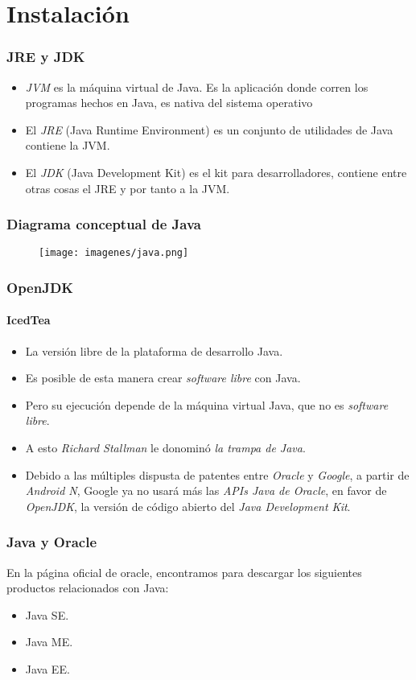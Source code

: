 \documentclass{beamer}
\begin{document}
\section{Instalación}

\begin{frame}[fragile]
\frametitle{JRE y JDK}
\begin{itemize}[<+->]
\item \emph{JVM} es la máquina virtual de Java. Es la aplicación donde corren los programas hechos en Java, es nativa del sistema operativo 
\item El \emph{JRE} (Java Runtime Environment) es un conjunto de utilidades de Java contiene la JVM. 
\item El \emph{JDK} (Java Development Kit) es el kit para desarrolladores, contiene entre otras cosas el JRE y por tanto a la JVM.
\end{itemize}
\end{frame}

\begin{frame}
\frametitle{Diagrama conceptual de Java}
\begin{figure}
\texttt{[image: imagenes/java.png]}
\end{figure}
\end{frame}

\begin{frame}
\frametitle{OpenJDK}
\framesubtitle{IcedTea}
\begin{itemize}[<+->]
\item La versión libre de la plataforma de desarrollo Java.
\item Es posible de esta manera crear \emph{software libre} con Java.
\item Pero su ejecución depende de la máquina virtual Java, que no es \emph{software libre}.
\item A esto \emph{Richard Stallman} le donominó \emph{la trampa de Java}.
\item Debido a las múltiples dispusta de patentes entre \emph{Oracle} y \emph{Google}, a partir de \emph{Android N}, Google ya no usará más las \emph{APIs Java de Oracle}, en favor de \emph{OpenJDK}, la versión de código abierto del \emph{Java Development Kit}.
\end{itemize}
\end{frame}

\begin{frame}
\frametitle{Java y Oracle}
En la página oficial de oracle, encontramos para descargar los siguientes productos relacionados con Java:
\begin{itemize}[<+->]
\item Java SE.
\item Java ME.
\item Java EE.
\end{itemize}
\end{frame}
\end{document}
